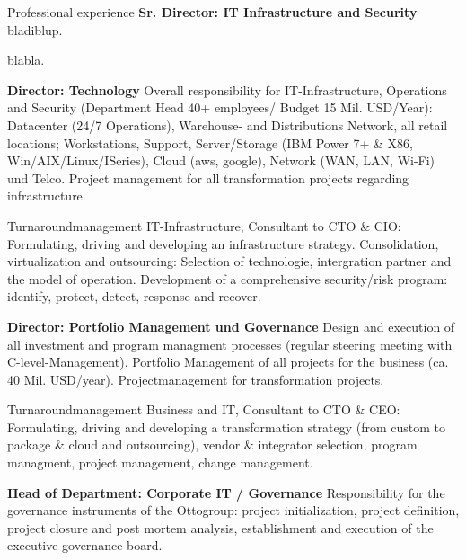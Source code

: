 \begin{rubric}{Professional experience}
\entry*[08/2015 - today] \textbf{Sr. Director: IT Infrastructure and Security}\newline
{} 
bladiblup.

blabla.

\entry*[04/2013 - 08/2015] \textbf{Director: Technology}\newline
{} 
Overall responsibility for IT-Infrastructure, Operations and Security (Department Head 40+ employees/ Budget 15 Mil. USD/Year): Datacenter (24/7 Operations), Warehouse- and Distributions Network, all retail locations; Workstations, Support, Server/Storage (IBM Power 7+ \& X86, Win/AIX/Linux/ISeries), Cloud (aws, google), Network (WAN, LAN, Wi-Fi) und Telco. Project management for all transformation projects regarding infrastructure.

Turnaroundmanagement IT-Infrastructure, Consultant to CTO \& CIO: Formulating, driving and developing an infrastructure strategy. Consolidation, virtualization and outsourcing: Selection of technologie, intergration partner and the model of operation. Development of a comprehensive security/risk program: identify, protect, detect, response and recover.

\entry*[10/2011 - 03/2013] \textbf{Director: Portfolio Management und Governance}\newline
{} 
Design and execution of all investment and program managment processes (regular steering meeting with C-level-Management). Portfolio Management of all projects for the business (ca. 40 Mil. USD/year). Projectmanagement for transformation projects.\axelvspace

Turnaroundmanagement Business and IT, Consultant to CTO \& CEO: Formulating, driving and developing a transformation strategy (from custom to package \& cloud and outsourcing), vendor \& integrator selection, program managment, project management, change management.\newline

\pagebreak
{}
\entry*[08/2009 - 10/2011] \textbf{Head of Department: Corporate IT / Governance}\newline
{} 
Responsibility for the governance instruments of the Ottogroup: project initialization, project definition, project closure and post mortem analysis, establishment and execution of the executive governance board.\axelvspace


\end{rubric}
